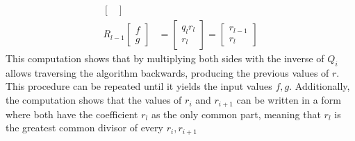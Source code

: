 \documentclass[11pt,a4paper]{article}
\begin{document}
\begin{enumerate}
\begin{enumerate}
\begin{align*}
\begin{bmatrix}
			                                                                \end{bmatrix}    \\
			            R_{l - 1}\begin{bmatrix}
				                     f \\ g
			                     \end{bmatrix}            & = \begin{bmatrix}
				                                                  q_lr_l \\ r_l
			                                                  \end{bmatrix} = \begin{bmatrix}
				                                                                  r_{l - 1} \\ r_l
			                                                                  \end{bmatrix}
		            \end{align*}
		            This computation shows that by multiplying both sides with the inverse of $Q_i$ allows traversing
		            the algorithm backwards, producing the previous values of $r$. This procedure can be repeated until it yields the input values $f, g$.
		            Additionally, the computation shows that the values of $r_i$ and $r_{i + 1}$ can be written in a form where both have the coefficient
		            $r_l$ as the only common part, meaning that $r_l$ is the greatest common divisor of every $r_i, r_{i + 1}$
					
					\newpage

					
	      \end{enumerate}
\end{enumerate}
\end{document}
